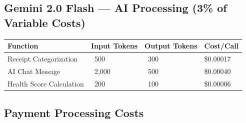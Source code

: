 \documentclass[11pt,a4paper]{article}
\begin{document}
\vspace{0.5cm}

\subsection*{\textcolor{milosecondary}{Gemini 2.0 Flash --- AI Processing (3\% of Variable Costs)}}

\begin{center}
\renewcommand{\arraystretch}{1.4}
\begin{tabular}{>{\raggedright\arraybackslash}p{4cm} >{\centering\arraybackslash}p{2.5cm} >{\centering\arraybackslash}p{2.5cm} >{\centering\arraybackslash}p{2.5cm}}
\toprule
\rowcolor{miloprimary!15}
\textbf{Function} & \textbf{Input Tokens} & \textbf{Output Tokens} & \textbf{Cost/Call} \\
\midrule
Receipt Categorization & ~500 & ~300 & \$0.00017 \\
\rowcolor{lightbg}
AI Chat Message & ~2,000 & ~500 & \$0.00040 \\
Health Score Calculation & ~200 & ~100 & \$0.00006 \\
\bottomrule
\end{tabular}
\end{center}

\vspace{0.3cm}

\begin{center}
\end{center}

\vspace{0.5cm}

\subsection*{\textcolor{milosecondary}{Payment Processing Costs}}
\end{document}
